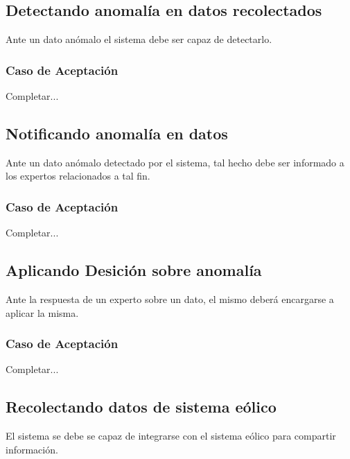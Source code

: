 \linea \subsection*{Detectando anomalía en datos recolectados}
Ante un dato anómalo el sistema debe ser capaz de detectarlo.
\subsubsection*{Caso de Aceptación}
Completar...

\linea \subsection*{Notificando anomalía en datos}
Ante un dato anómalo detectado por el sistema, tal hecho debe ser informado a los expertos relacionados a tal fin.
\subsubsection*{Caso de Aceptación}
Completar...

\linea \subsection*{Aplicando Desición sobre anomalía}
Ante la respuesta de un experto sobre un dato, el mismo deberá encargarse a aplicar la misma.
\subsubsection*{Caso de Aceptación}
Completar...

\linea \subsection*{Recolectando datos de sistema eólico}
El sistema se debe se capaz de integrarse con el sistema eólico para compartir información.
